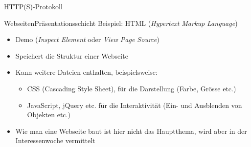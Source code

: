 \begin{frame}[fragile]{\faServer{} HTTP(S)-Protokoll}
\begin{figure}[H]
{}
    \end{figure}
\end{frame}



\begin{frame}[fragile]{\faLaptop{} Webseiten}{Präsentationsschicht}
    Beispiel: HTML (\textit{Hypertext Markup Language})
    \begin{itemize}[<+->]
        \item Demo (\textit{Inspect Element} oder \textit{View Page Source})
        \item Speichert die Struktur einer Webseite
        \item Kann weitere Dateien enthalten, beispielsweise:
              \begin{itemize}
                  \item CSS (Cascading Style Sheet), für die Darstellung (Farbe, Grösse etc.)
                  \item JavaScript, jQuery etc. für die Interaktivität (Ein- und Ausblenden von Objekten etc.)
              \end{itemize}
        \item Wie man eine Webseite baut ist hier nicht das Hauptthema, wird aber in der Interessenwoche vermittelt
    \end{itemize}
\end{frame}

